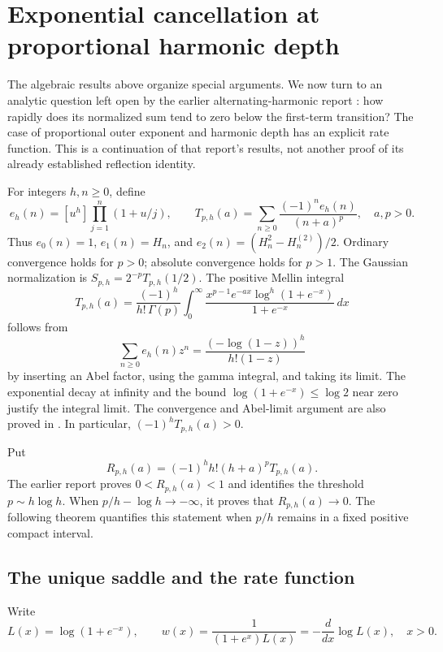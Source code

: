 \section{Exponential cancellation at proportional harmonic depth}
\label{sec:saddle}

The algebraic results above organize special arguments. We now turn to an
analytic question left open by the earlier alternating-harmonic report
\cite{repoHarmonic}: how rapidly does its normalized sum tend to zero
below the first-term transition? The case of proportional outer exponent
and harmonic depth has an explicit rate function. This is a continuation
of that report's results, not another proof of its already established
reflection identity.

For integers $h,n\geq0$, define
\[
 e_h(n)=[u^h]\prod_{j=1}^n(1+u/j),\qquad
 T_{p,h}(a)=\sum_{n\geq0}\frac{(-1)^ne_h(n)}{(n+a)^p},
 \quad a,p>0.
\]
Thus $e_0(n)=1$, $e_1(n)=H_n$, and
$e_2(n)=(H_n^2-H_n^{(2)})/2$. Ordinary convergence holds for $p>0$;
absolute convergence holds for $p>1$. The Gaussian normalization is
$S_{p,h}=2^{-p}T_{p,h}(1/2)$. The positive Mellin integral
\begin{equation}\label{eq:positive-mellin}
 T_{p,h}(a)=\frac{(-1)^h}{h!\,\Gamma(p)}
 \int_0^\infty
 \frac{x^{p-1}e^{-ax}\log^h(1+e^{-x})}{1+e^{-x}}\,dx
\end{equation}
follows from
\[
 \sum_{n\geq0}e_h(n)z^n
 =\frac{(-\log(1-z))^h}{h!(1-z)}
\]
by inserting an Abel factor, using the gamma integral, and taking its
limit. The exponential decay at infinity and the bound
$\log(1+e^{-x})\leq\log2$ near zero justify the integral limit.
The convergence and Abel-limit argument are also proved in
\cite[Section 3]{repoHarmonic}. In particular,
$(-1)^hT_{p,h}(a)>0$.

Put
\begin{equation}\label{eq:R-definition}
 R_{p,h}(a)=(-1)^h h!(h+a)^p T_{p,h}(a).
\end{equation}
The earlier report proves $0<R_{p,h}(a)<1$ and identifies the threshold
$p\sim h\log h$. When $p/h-\log h\to-\infty$, it proves that
$R_{p,h}(a)\to0$. The following theorem quantifies this statement when
$p/h$ remains in a fixed positive compact interval.

\subsection{The unique saddle and the rate function}

Write
\begin{equation}\label{eq:L-w}
 L(x)=\log(1+e^{-x}),\qquad
 w(x)=\frac1{(1+e^x)L(x)}=-\frac{d}{dx}\log L(x),\quad x>0.
\end{equation}

